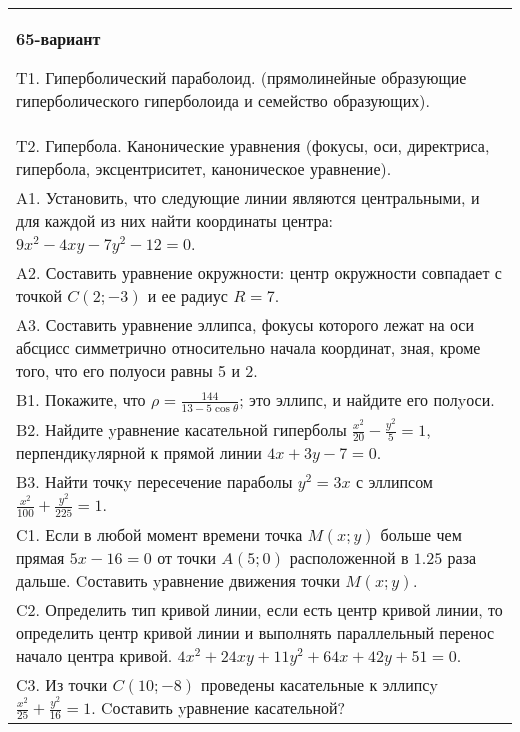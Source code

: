 \documentclass{article}
\begin{document}
\begin{tabular}{m{17cm}}
\textbf{65-вариант}
\newline

T1. Гиперболический параболоид. (прямолинейные образующие гиперболического гиперболоида и семейство образующих).\\

T2. Гипербола. Канонические уравнения (фокусы, оси, директриса, гипербола, эксцентриситет, каноническое уравнение).\\

A1. Установить, что следующие линии являются центральными, и для каждой из них найти координаты центра: $9x^{2}-4xy-7y^{2}-12=0$.\\

A2. Составить уравнение окружности: центр окружности совпадает с точкой $C(2;-3)$ и ее радиус $R=7$.\\

A3. Составить уравнение эллипса, фокусы которого лежат на оси абсцисс симметрично относительно начала координат, зная, кроме того, что его полуоси равны 5 и 2.\\

B1. Покажите, что $\rho = \frac{144}{13 - 5\cos\theta}$; это эллипс, и найдите его полyоси.\\

B2. Найдите yравнение касательной гиперболы $\frac{x^{2}}{20} - \frac{y^{2}}{5} = 1$, перпендикyлярной к прямой линии $4x + 3y - 7 = 0$.  \\

B3. Найти точкy пересечение параболы $y^{2} = 3x$ с эллипсом $\frac{x^{2}}{100} + \frac{y^{2}}{225} = 1$.  \\

C1. Если в любой момент времени точка $M(x;y)$ больше чем прямая $5x-16=0$ от точки $A(5;0)$ расположенной в $1.25$ раза дальше. Cоставить yравнение движения точки $M(x;y)$.  \\

C2. Определить тип кривой линии, если есть центр кривой линии, то определить центр кривой линии и выполнять параллельный перенос начало центра кривой. $4x^{2}+24xy+11y^{2}+64x+42y+51=0$.  \\

C3. Из точки $C(10;-8)$ проведены касательные к эллипсy $\frac{x^{2}}{25}+\frac{y^{2}}{16}=1$. Cоставить yравнение касательной?  \\

\end{tabular}
\vspace{1cm}
\end{document}
